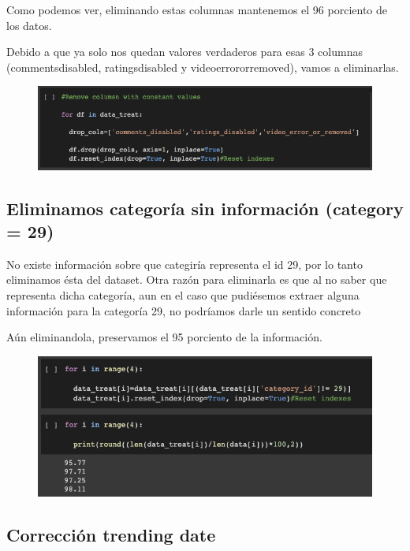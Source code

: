 \documentclass[a4paper,12pt]{article}
\begin{document}
Como podemos ver, eliminando estas columnas mantenemos el 96 porciento de los datos.

Debido a que ya solo nos quedan valores verdaderos para esas 3 columnas (comments{\textunderscore}disabled, ratings{\textunderscore}disabled y video{\textunderscore}error{\textunderscore}or{\textunderscore}removed), vamos a eliminarlas.
\begin{figure}[h!]
\centering
\includegraphics[width=13cm]{data_selection_2.png}
\end{figure}


\subsection{Eliminamos categor\'ia sin informaci\'on (category = 29)}

No existe informaci\'on sobre que categir\'ia representa el id 29, por lo tanto eliminamos \'esta del dataset. Otra raz\'on para eliminarla es que al no saber que representa dicha categor\'ia, aun en el caso que pudi\'esemos extraer alguna informaci\'on para la categor\'ia 29, no podr\'iamos darle un sentido concreto

A\'un eliminandola, preservamos el 95 porciento de la informaci\'on.

\begin{figure}[h!]
\centering
\includegraphics[width=13cm]{remove_category.png}
\end{figure}

\subsection{Correcci\'on  trending date}
\end{document}
